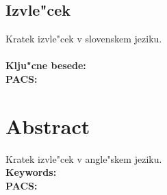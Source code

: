 \begin{otherlanguage}{slovene}

\cleardoublepage
\chapter*{Izvle"cek}
Kratek izvle"cek v slovenskem jeziku.\\
\vspace{1cm}\\
{\bf Klju"cne besede:}\\
{\bf PACS:}
\end{otherlanguage}

\pagestyle{empty}

\cleardoublepage
\pagestyle{plain}
\chapter*{Abstract}
Kratek izvle"cek v angle"skem jeziku.
\vspace{1cm}\\
{\bf Keywords:}\\
{\bf PACS:}

\pagestyle{empty}

\tableofcontents
\pagestyle{plain}
